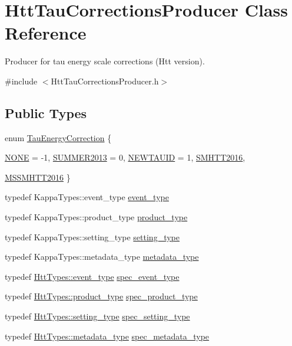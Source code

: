 \hypertarget{classHttTauCorrectionsProducer}{
\section{HttTauCorrectionsProducer Class Reference}
\label{classHttTauCorrectionsProducer}
}


Producer for tau energy scale corrections (Htt version).  


{\ttfamily \#include $<$HttTauCorrectionsProducer.h$>$}\subsection*{Public Types}
\begin{DoxyCompactItemize}
\item 
enum \hyperlink{classHttTauCorrectionsProducer_acc717e96c2a4615a19cad294596fb2f8}{TauEnergyCorrection} \{ \par
\hyperlink{classHttTauCorrectionsProducer_acc717e96c2a4615a19cad294596fb2f8a0100ab9ea446921eeaa0afa8897bc835}{NONE} =  -\/1, 
\hyperlink{classHttTauCorrectionsProducer_acc717e96c2a4615a19cad294596fb2f8a395906167299d7ca1efc972b37f56542}{SUMMER2013} =  0, 
\hyperlink{classHttTauCorrectionsProducer_acc717e96c2a4615a19cad294596fb2f8a41fdbd59ae3ac1c079321490dc2f9357}{NEWTAUID} =  1, 
\hyperlink{classHttTauCorrectionsProducer_acc717e96c2a4615a19cad294596fb2f8ae11388885bd3683fdf33074da89042ed}{SMHTT2016}, 
\par
\hyperlink{classHttTauCorrectionsProducer_acc717e96c2a4615a19cad294596fb2f8ad7231809c1351c46aa3253d44c29a522}{MSSMHTT2016}
 \}
\item 
typedef KappaTypes::event\_\-type \hyperlink{classHttTauCorrectionsProducer_a5f98d673ed860926fc2f057a600839bc}{event\_\-type}
\item 
typedef KappaTypes::product\_\-type \hyperlink{classHttTauCorrectionsProducer_abc73e85eb18f55e8bee20a8c65c90cdc}{product\_\-type}
\item 
typedef KappaTypes::setting\_\-type \hyperlink{classHttTauCorrectionsProducer_a710b2e9a72d130b031cafe041a85ea38}{setting\_\-type}
\item 
typedef KappaTypes::metadata\_\-type \hyperlink{classHttTauCorrectionsProducer_ae29469055ab934186c32520cefd75bb5}{metadata\_\-type}
\item 
typedef \hyperlink{classHttEvent}{HttTypes::event\_\-type} \hyperlink{classHttTauCorrectionsProducer_ae32e39786600e8e67c480c5551a1e8be}{spec\_\-event\_\-type}
\item 
typedef \hyperlink{classHttProduct}{HttTypes::product\_\-type} \hyperlink{classHttTauCorrectionsProducer_ae64e3c74df3b92cbd379ac4e59cfec55}{spec\_\-product\_\-type}
\item 
typedef \hyperlink{classHttSettings}{HttTypes::setting\_\-type} \hyperlink{classHttTauCorrectionsProducer_aa42fcd9da7e1096141057f55878fe9e1}{spec\_\-setting\_\-type}
\item 
typedef \hyperlink{classHttMetadata}{HttTypes::metadata\_\-type} \hyperlink{classHttTauCorrectionsProducer_a1360d8d058cd25d09e1ef47cf3f37fc1}{spec\_\-metadata\_\-type}
\end{DoxyCompactItemize}
